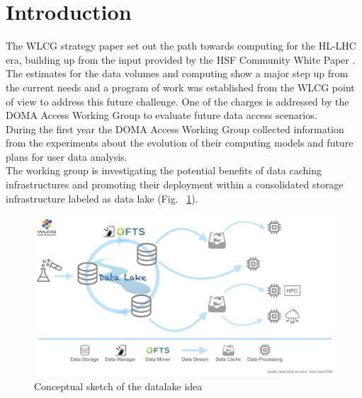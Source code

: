 \section{Introduction}
The WLCG strategy paper \cite{wlcgstrategy} set out the path towards computing for the HL-LHC era, building up from the input provided by the HSF \cite{hsf} Community White Paper \cite{cwp}.
The estimates for the data volumes and computing show a major step up from the current needs and a program of work was established from the WLCG point of view to address this future challenge. One of the charges is addressed by the DOMA Access Working Group to evaluate future data access scenarios.\\
During the first year the DOMA Access Working Group collected information from the experiments about the evolution of their computing models
and future plans for user data analysis.\\
The working group is investigating the potential benefits of data caching infrastructures and promoting their deployment within a consolidated storage infrastructure labeled as data lake (Fig. ~\ref{datalake-sketch-horizontal}).

\begin{figure}
  \centering
  \includegraphics[height=6cm]{Datalake-sketch-horizontal.png}
  \caption{{\em} Conceptual sketch of the datalake idea}
  \label{datalake-sketch-horizontal}
\end{figure}




